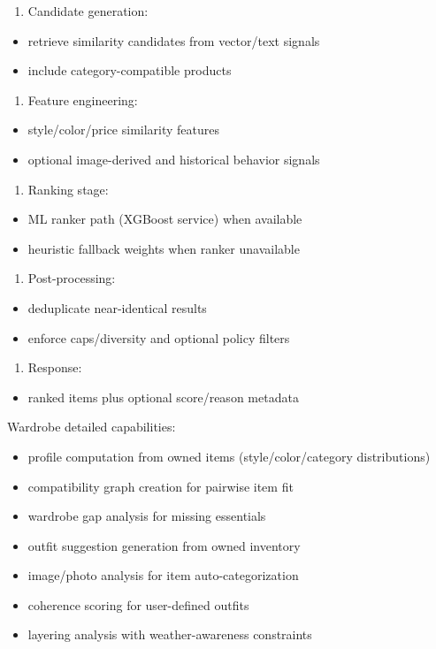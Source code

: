 \documentclass[12pt,a4paper]{report}
\begin{document}
\begin{enumerate}
\item Candidate generation:
\end{enumerate}
\begin{itemize}
\item retrieve similarity candidates from vector/text signals
\item include category-compatible products
\end{itemize}
\begin{enumerate}
\item Feature engineering:
\end{enumerate}
\begin{itemize}
\item style/color/price similarity features
\item optional image-derived and historical behavior signals
\end{itemize}
\begin{enumerate}
\item Ranking stage:
\end{enumerate}
\begin{itemize}
\item ML ranker path (XGBoost service) when available
\item heuristic fallback weights when ranker unavailable
\end{itemize}
\begin{enumerate}
\item Post-processing:
\end{enumerate}
\begin{itemize}
\item deduplicate near-identical results
\item enforce caps/diversity and optional policy filters
\end{itemize}
\begin{enumerate}
\item Response:
\end{enumerate}
\begin{itemize}
\item ranked items plus optional score/reason metadata
\end{itemize}

Wardrobe detailed capabilities:

\begin{itemize}
\item profile computation from owned items (style/color/category distributions)
\item compatibility graph creation for pairwise item fit
\item wardrobe gap analysis for missing essentials
\item outfit suggestion generation from owned inventory
\item image/photo analysis for item auto-categorization
\item coherence scoring for user-defined outfits
\item layering analysis with weather-awareness constraints
\end{itemize}
\end{document}
